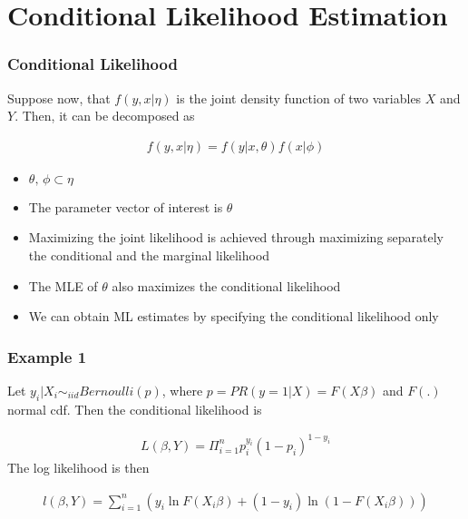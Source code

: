 \documentclass[
  shownotes,
  xcolor={svgnames},
  hyperref={colorlinks,citecolor=DarkBlue,linkcolor=DarkRed,urlcolor=DarkBlue}
  ]{beamer}
\begin{document}
\section{Conditional Likelihood Estimation}
\begin{frame}[fragile]
\frametitle{Conditional Likelihood }

Suppose now, that $f(y,x|\eta)$ is the joint density function of two variables $X$ and $Y$.  Then, it can be decomposed as

\begin{align}
f(y,x|\eta) =f(y|x,\theta)f(x|\phi)
\end{align}

\begin{itemize}
  \item $\theta,\,\phi \subset \eta$ 
  \medskip
  \item The parameter vector of interest is  $\theta$
  \medskip
  \item Maximizing the joint likelihood is achieved through maximizing separately the conditional and the marginal likelihood
  \medskip
  \item The MLE of $\theta$ also maximizes the conditional likelihood  
  \medskip
  \item We can obtain ML estimates by specifying the conditional likelihood only
\end{itemize}  

 
\end{frame}
\begin{frame}[fragile]
\frametitle{Example 1}

Let $y_i|X_i \sim_{iid} Bernoulli(p)$, where $p=PR(y=1|X)=F(X\beta)$ and $F(.)$ normal cdf. Then the conditional likelihood is

\begin{align}
L(\beta,Y)=\Pi_{i=1}^n p_i^{y_i}(1-p_i)^{1-y_i}
\end{align}
The log likelihood is then

\begin{align}
l(\beta,Y)=\sum_{i=1}^n\left(y_i \ln F(X_i\beta)+(1-y_i)\ln(1-F(X_i\beta))\right)
\end{align}

\end{frame}
\end{document}

